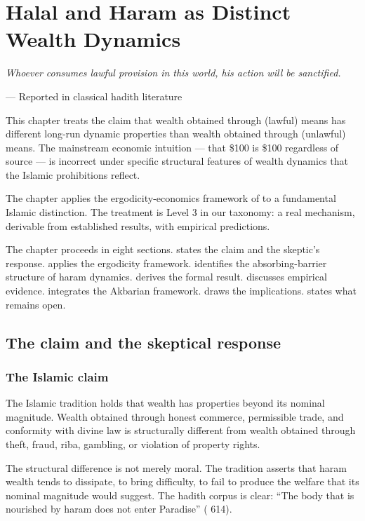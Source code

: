 \chapter{Halal and Haram as Distinct Wealth Dynamics}
\label{ch:halal-haram}

\epigraph{\itshape Whoever consumes lawful provision in this world,
his action will be sanctified.}{--- Reported in classical hadith
literature}

\noindent
This chapter treats the claim that wealth obtained through
 (lawful) means has different long-run dynamic properties
than wealth obtained through  (unlawful) means.
The mainstream economic intuition --- that \$100 is \$100
regardless of source --- is incorrect under specific structural
features of wealth dynamics that the Islamic prohibitions reflect.

The chapter applies the ergodicity-economics framework of
 to a fundamental Islamic distinction. The
treatment is Level 3 in our taxonomy: a real mechanism, derivable
from established results, with empirical predictions.

The chapter proceeds in eight sections.
 states the claim and the skeptic's response.
 applies the ergodicity framework.
 identifies the absorbing-barrier structure
of haram dynamics.
 derives the formal result.
 discusses empirical evidence.
 integrates the Akbarian framework.
 draws the implications.
 states what remains open.

\section{The claim and the skeptical response}
\label{sec:halal-claim}

\subsection{The Islamic claim}

The Islamic tradition holds that wealth has properties beyond its
nominal magnitude. Wealth obtained through honest commerce,
permissible trade, and conformity with divine law is structurally
different from wealth obtained through theft, fraud, riba,
gambling, or violation of property rights.

The structural difference is not merely moral. The tradition
asserts that haram wealth tends to dissipate, to bring difficulty,
to fail to produce the welfare that its nominal magnitude would
suggest. The hadith corpus is clear: ``The body that is nourished
by haram does not enter Paradise'' ( 614).

